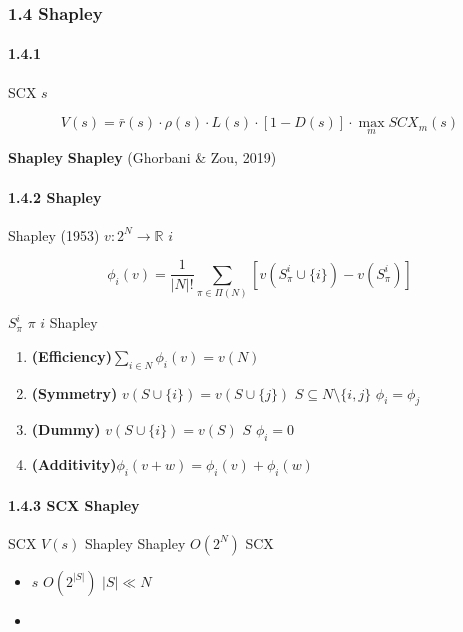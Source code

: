 \documentclass[
  12pt,
]{article}
\providecommand{\tightlist}{%
  \setlength{\itemsep}{0pt}\setlength{\parskip}{0pt}}
\begin{document}
\subsubsection{1.4 Shapley
}\label{ux6570ux636eux4ef7ux503cshapley-ux516cux7406ux4e0eux5408ux4f5cux535aux5f08ux8bba}

\paragraph{1.4.1
}\label{ux6570ux636eux4ef7ux503cux51fdux6570ux7684ux5f62ux5f0f}

SCX  \(s\) \textbf{}

\[V(s) = \bar{r}(s) \cdot \rho(s) \cdot L(s) \cdot [1 - D(s)] \cdot \max_m SCX_m(s)\]

\textbf{Shapley
}\textbf{ Shapley} (Ghorbani \& Zou, 2019)

\paragraph{1.4.2 Shapley
}\label{shapley-ux503cux7684ux516cux7406}

Shapley (1953)  \(v: 2^N \to \mathbb{R}\)  \(i\)


\[\phi_i(v) = \frac{1}{|N|!} \sum_{\pi \in \Pi(N)} [v(S_\pi^i \cup \{i\}) - v(S_\pi^i)]\]

 \(S_\pi^i\)  \(\pi\)  \(i\) Shapley


\begin{enumerate}
\def\labelenumi{\arabic{enumi}.}
\tightlist
\item
  \textbf{ (Efficiency)}\(\sum_{i \in N} \phi_i(v) = v(N)\)
\item
  \textbf{ (Symmetry)} \(v(S \cup \{i\}) = v(S \cup \{j\})\)
   \(S \subseteq N \setminus \{i,j\}\) \(\phi_i = \phi_j\)
\item
  \textbf{ (Dummy)} \(v(S \cup \{i\}) = v(S)\) 
  \(S\) \(\phi_i = 0\)
\item
  \textbf{
  (Additivity)}\(\phi_i(v + w) = \phi_i(v) + \phi_i(w)\)
\end{enumerate}

\paragraph{1.4.3 SCX  Shapley
}\label{scx-ux4ef7ux503cux51fdux6570ux4e0e-shapley-ux7684ux504fux79bb}

SCX  \(V(s)\)  Shapley
\textbf{} Shapley 
\(O(2^N)\) SCX 

\begin{itemize}
\tightlist
\item
  \textbf{} \(s\)
  \(O(2^{|S|})\)  \(|S| \ll N\)
\item
  \textbf{}
\end{itemize}
\end{document}
